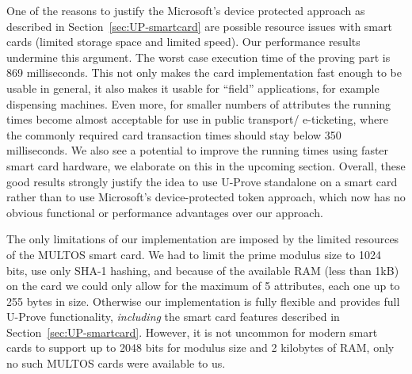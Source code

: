 One of the reasons to justify the Microsoft's device protected approach as
described in Section~\ref{sec:UP-smartcard} are possible resource issues with
smart cards (limited storage space and limited speed). Our performance results
undermine this argument. The worst case execution time of the proving part is
869 milliseconds. This not only makes the card implementation fast enough to be
usable in general, it also makes it usable for ``field'' applications, for
example dispensing machines. Even more, for smaller numbers of attributes the
running times become almost acceptable for use in public transport\slash
e-ticketing, where the commonly required card transaction times should stay
below 350 milliseconds. We also see a potential to improve the running times
using faster smart card hardware, we elaborate on this in the upcoming section.
Overall, these good results strongly justify the idea to use U-Prove standalone
on a smart card rather than to use Microsoft's device-protected token approach,
which now has no obvious functional or performance advantages over our approach.

The only limitations of our implementation are imposed by the limited resources
of the MULTOS smart card. We had to limit the prime modulus size to 1024 bits,
use only SHA-1 hashing, and because of the available RAM (less than 1kB) on the
card we could only allow for the maximum of 5 attributes, each one up to 255
bytes in size. Otherwise our implementation is fully flexible and provides full
U-Prove functionality, \emph{including} the smart card features described in
Section~\ref{sec:UP-smartcard}. However, it is not uncommon for modern smart
cards to support up to 2048 bits for modulus size and 2 kilobytes of RAM, only
no such MULTOS cards were available to us.